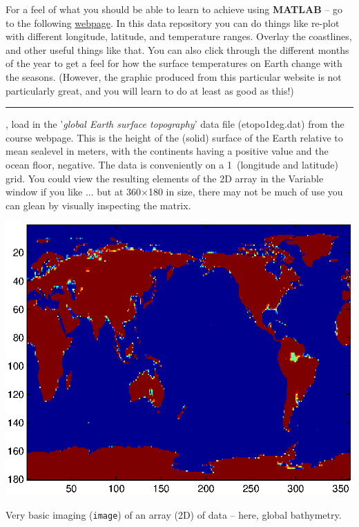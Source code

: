 \documentclass{tufte-book} %
\begin{document}
For a feel of what you should be able to learn to achieve using \textbf{MATLAB} -- go to the following \href{http://iridl.ldeo.columbia.edu/SOURCES/.LEVITUS94/.MONTHLY/.temp/#views}{webpage}. In this data repository you can do things like re-plot with different longitude, latitude, and temperature ranges. Overlay the coastlines, and other useful things like that. You can also click through the different months of the year to get a feel for how the surface temperatures on Earth change with the seasons. (However, the graphic produced from this particular website is not particularly great, and you will learn to do at least as good as this!)


\vspace{1mm}
\noindent\rule{4cm}{0.5pt}
\vspace{-2mm}


, load in the '\textit{global Earth surface topography}' data file (\textsf{etopo1deg.dat}) from the course webpage. This is the height of the  (solid) surface of the Earth relative to mean sealevel in meters, with the continents having a positive value and the ocean floor, negative. The data is conveniently on a 1\degree\ (longitude and latitude) grid. You could view the resulting elements of the 2D array in the Variable window if you like ... but at 360\(\times\)180
in size, there may not be much of use you can glean by visually inspecting the matrix.

\begin{marginfigure}[-1.25in]
\includegraphics[width=\linewidth]{ch3-etopo.eps}
\caption{Very basic imaging (\texttt{image}) of an array (2D) of data -- here, global bathymetry.}
\label{fig:ch3-etopo}
\end{marginfigure}
\end{document}
